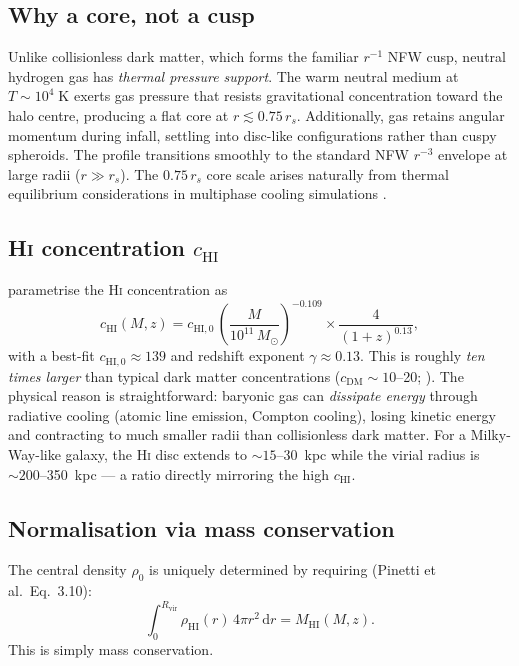 \documentclass[10pt,a4paper]{article}
\newcommand{\Msun}{M_{\odot}}
\newcommand{\MHI}{M_{\mathrm{HI}}}
\newcommand{\cHI}{c_{\mathrm{HI}}}
\newcommand{\rhoHI}{\rho_{\mathrm{HI}}}
\begin{document}
\subsection{Why a core, not a cusp}

Unlike collisionless dark matter, which forms the familiar $r^{-1}$ NFW cusp,
neutral hydrogen gas has \emph{thermal pressure support}.  The warm neutral
medium at $T \sim 10^{4}\;\mathrm{K}$ exerts gas pressure that resists
gravitational concentration toward the halo centre, producing a flat core at
$r \lesssim 0.75\,r_s$.  Additionally, gas retains angular momentum during
infall, settling into disc-like configurations rather than cuspy spheroids.
The profile transitions smoothly to the standard NFW $r^{-3}$ envelope at
large radii ($r \gg r_s$).  The $0.75\,r_s$ core scale arises naturally from
thermal equilibrium considerations in multiphase cooling simulations
\citep{Cole2000,MallerBullock2004}.


\subsection{H\textsc{i} concentration \texorpdfstring{$\cHI$}{c\_HI}}

\citet{Padmanabhan2017} parametrise the H\textsc{i} concentration as
\begin{equation}
  \cHI(M, z) = c_{\mathrm{HI},0}\,
  \left(\frac{M}{10^{11}\,\Msun}\right)^{-0.109}
  \times \frac{4}{(1+z)^{0.13}},
\end{equation}
with a best-fit $c_{\mathrm{HI},0} \approx 139$ and redshift exponent
$\gamma \approx 0.13$.  This is roughly
\emph{ten times larger} than typical dark matter concentrations
($c_{\mathrm{DM}} \sim 10$--20; \citealt{Maccio2007}).  The physical reason
is straightforward: baryonic gas can \emph{dissipate energy} through radiative
cooling (atomic line emission, Compton cooling), losing kinetic energy and
contracting to much smaller radii than collisionless dark matter.  For a
Milky-Way-like galaxy, the H\textsc{i} disc extends to $\sim\!15$--30~kpc
while the virial radius is $\sim\!200$--350~kpc --- a ratio directly
mirroring the high $\cHI$.


\subsection{Normalisation via mass conservation}

The central density $\rho_0$ is uniquely determined by requiring (Pinetti
et al.\ Eq.~3.10):
\begin{equation}
  \label{eq:mass-conservation}
  \int_{0}^{R_{\mathrm{vir}}} \rhoHI(r)\,4\pi r^{2}\,\mathrm{d}r
  = \MHI(M, z).
\end{equation}
This is simply mass conservation.
\end{document}
